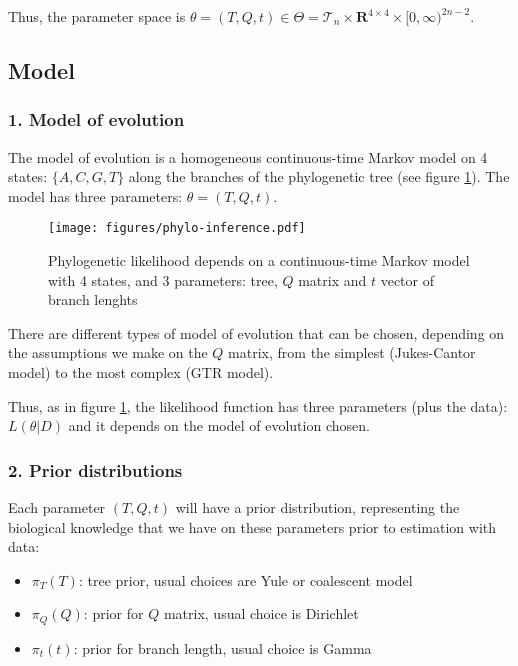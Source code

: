 \documentclass[]{article}
\providecommand{\tightlist}{%
  \setlength{\itemsep}{0pt}\setlength{\parskip}{0pt}}
\begin{document}
Thus, the parameter space is
\(\theta = (T,Q,t) \in \Theta = \mathcal{T}_n \times \mathbf{R}^{4 \times 4} \times [0,\infty)^{2n-2}\).

\hypertarget{model}{%
\subsection{Model}\label{model}}

\hypertarget{model-of-evolution}{%
\subsubsection{1. Model of evolution}\label{model-of-evolution}}

The model of evolution is a homogeneous continuous-time Markov model on
4 states: \(\{A,C,G,T\}\) along the branches of the phylogenetic tree
(see figure \ref{phylo-inf}). The model has three parameters:
\(\theta = (T,Q,t)\).

\begin{figure}[ht]
\centering
\texttt{[image: figures/phylo-inference.pdf]}
\caption{Phylogenetic likelihood depends on a continuous-time Markov model with 4 states, and 3 parameters: tree, $Q$ matrix and $t$ vector of branch lenghts}
\label{phylo-inf}
\end{figure}

There are different types of model of evolution that can be chosen,
depending on the assumptions we make on the \(Q\) matrix, from the
simplest (Jukes-Cantor model) to the most complex (GTR model).

Thus, as in figure \ref{phylo-inf}, the likelihood function has three
parameters (plus the data): \(L(\theta|D)\) and it depends on the model
of evolution chosen.

\hypertarget{prior-distributions}{%
\subsubsection{2. Prior distributions}\label{prior-distributions}}

Each parameter \((T,Q,t)\) will have a prior distribution, representing
the biological knowledge that we have on these parameters prior to
estimation with data:

\begin{itemize}
\tightlist
\item
  \(\pi_T(T)\): tree prior, usual choices are Yule or coalescent model
\item
  \(\pi_Q(Q)\): prior for \(Q\) matrix, usual choice is Dirichlet
\item
  \(\pi_t(t)\): prior for branch length, usual choice is Gamma
\end{itemize}
\end{document}
